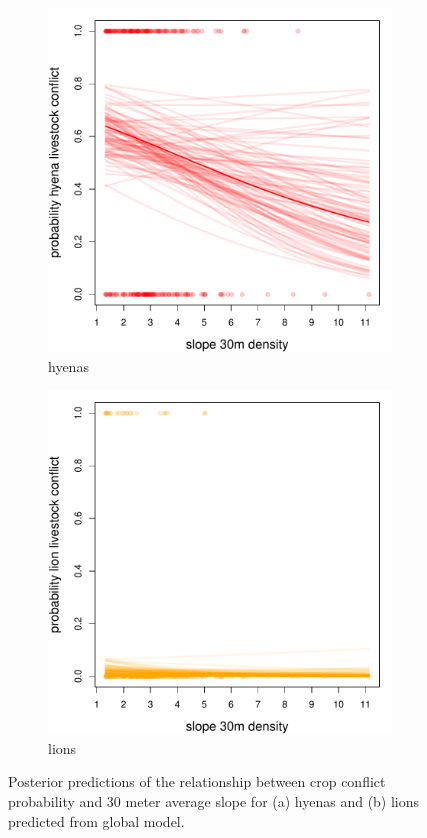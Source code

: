 \documentclass[12pt,]{article}
\begin{document}
\begin{figure}
  \centering
	\begin{subfigure}[b]{0.49\textwidth}
	\includegraphics[width=\textwidth]{Figures/slope30m_livestock_global_conflict_hyena.pdf} 
    \caption{hyenas}
   	    \label{fig:cropSLhyena}
\end{subfigure}
\begin{subfigure}[b]{0.49\textwidth}
	\includegraphics[width=\textwidth]{Figures/slope30m_livestock_global_conflict_lion.pdf}  
    \caption{lions}
  	\label{fig:cropSLleo}
\end{subfigure}
\caption{Posterior predictions of the relationship between crop conflict probability and 30 meter average slope for (a) hyenas and (b) lions predicted from global model.}
\end{figure}
\end{document}

